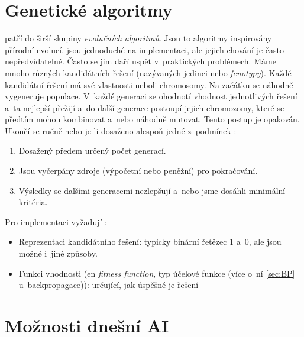 \documentclass[12pt,oneside]{report}			%
\begin{document}
	\section{Genetické algoritmy}	
	\label{sec:genetic} 
	 patří do širší skupiny \emph{evolučních algoritmů}. Jsou to algoritmy inspirovány přírodní evolucí.  jsou jednoduché na implementaci, ale jejich chování je často nepředvídatelné. Často se jim daří uspět v~praktických problémech. Máme mnoho různých kandidátních řešení (nazývaných jedinci nebo \emph{fenotypy}). Každé kandidátní řešení má své vlastnosti neboli chromosomy. Na začátku se náhodně vygeneruje populace. V~každé generaci se ohodnotí vhodnost jednotlivých řešení a~ta nejlepší přežijí a~do další generace postoupí jejich chromozomy, které se předtím mohou kombinovat a~nebo náhodně mutovat. Tento postup je opakován. Ukončí se ručně nebo je-li dosaženo alespoň jedné z~podmínek  \parencite[\gls{str} 50-53]{chaudhuri2017optical} :
	\begin{enumerate}
	\item{Dosažený předem určený počet generací.}
	\item{Jsou vyčerpány zdroje (výpočetní nebo peněžní) pro pokračování.}
	\item{Výsledky se dalšími generacemi nezlepšují a~nebo jsme dosáhli minimální kritéria.}
	\end{enumerate}
	Pro implementaci vyžadují \parencite[\gls{str} 50-53]{chaudhuri2017optical}:
	\begin{itemize}
	\item{Reprezentaci kandidátního řešení: typicky binární řetězec 1 a~0, ale jsou možné i~jiné způsoby.}
	\item{Funkci vhodnosti (\gls{en} \emph{fitness function}, typ účelové funkce (více o~ní \ref{sec:BP} u~backpropagace)): určující, jak úspěšné je řešení}
	\end{itemize}





	
	
	\section{Možnosti dnešní \gls{AI}}
	\label{sec:AI-now} %
	
\end{document}
